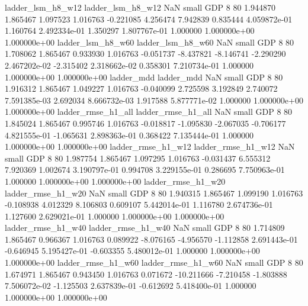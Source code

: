        ladder_lsm_h8_w12        ladder_lsm_h8_w12                   NaN      small      GDP                 8 80 1.944870       1.865467 1.097523       1.016763   -0.221085      4.256474      7.942839     0.835444   4.059872e-01  1.160764 2.492334e-01     1.350297   1.807767e-01            1.000000    1.000000e+00        1.000000e+00
       ladder_lsm_h8_w60        ladder_lsm_h8_w60                   NaN      small      GDP                 8 80 1.708062       1.865467 0.933930       1.016763   -0.051737     -8.437821     -8.146741    -2.290290   2.467202e-02 -2.315402 2.318662e-02     0.358301   7.210734e-01            1.000000    1.000000e+00        1.000000e+00
              ladder_mdd               ladder_mdd                   NaN      small      GDP                 8 80 1.916312       1.865467 1.049227       1.016763   -0.040099      2.725598      3.192849     2.740072   7.591385e-03  2.692034 8.666732e-03     1.917588   5.877771e-02            1.000000    1.000000e+00        1.000000e+00
      ladder_rmse_h1_all       ladder_rmse_h1_all                   NaN      small      GDP                 8 80 1.845024       1.865467 0.995746       1.016763   -0.018817     -1.095830     -2.067035    -0.706177   4.821555e-01 -1.065631 2.898363e-01     0.368422   7.135444e-01            1.000000    1.000000e+00        1.000000e+00
      ladder_rmse_h1_w12       ladder_rmse_h1_w12                   NaN      small      GDP                 8 80 1.987754       1.865467 1.097295       1.016763   -0.031437      6.555312      7.920369     1.002674   3.190797e-01  0.994708 3.229155e-01     0.286695   7.750963e-01            1.000000    1.000000e+00        1.000000e+00
      ladder_rmse_h1_w20       ladder_rmse_h1_w20                   NaN      small      GDP                 8 80 1.940315       1.865467 1.099190       1.016763   -0.108938      4.012329      8.106803     0.609107   5.442014e-01  1.116780 2.674736e-01     1.127600   2.629021e-01            1.000000    1.000000e+00        1.000000e+00
      ladder_rmse_h1_w40       ladder_rmse_h1_w40                   NaN      small      GDP                 8 80 1.714809       1.865467 0.966367       1.016763    0.089922     -8.076165     -4.956570    -1.112858   2.691443e-01 -0.646945 5.195427e-01    -0.603355   5.480012e-01            1.000000    1.000000e+00        1.000000e+00
      ladder_rmse_h1_w60       ladder_rmse_h1_w60                   NaN      small      GDP                 8 80 1.674971       1.865467 0.943450       1.016763    0.071672    -10.211666     -7.210458    -1.803888   7.506072e-02 -1.125503 2.637839e-01    -0.612692   5.418400e-01            1.000000    1.000000e+00        1.000000e+00
